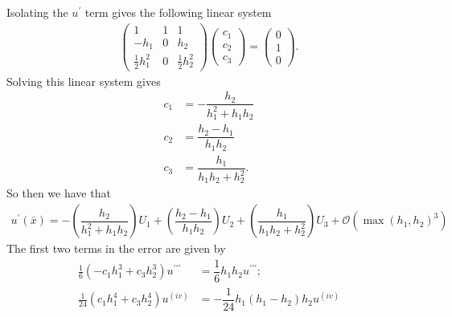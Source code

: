 \documentclass[12pt]{article}
\newcommand{\xbar}{\bar{x}}
\newcommand{\bO}{\mathcal{O}}
\begin{document}
Isolating the $u^{\prime}$ term gives the following linear system
\begin{align}
    \begin{pmatrix}
        1 & 1 & 1\\
        -h_{1} & 0 & h_{2}\\
        \frac{1}{2}h_{1}^{2} & 0 & \frac{1}{2}h_{2}^{2}
    \end{pmatrix}
    \begin{pmatrix}
        c_{1} \\ c_{2} \\ c_{3}
    \end{pmatrix}
    =
    \begin{pmatrix}
        0 \\ 1 \\ 0
    \end{pmatrix}.
\end{align}
Solving this linear system gives
\begin{align}
    c_{1} &= -\dfrac{h_{2}}{h_{1}^{2}+h_{1}h_{2}}\\
    c_{2} &= \dfrac{h_{2}-h_{1}}{h_{1}h_{2}}\\
    c_{3} &= \dfrac{h_{1}}{h_{1}h_{2}+h_{2}^{2}}.
\end{align}
So then we have that
\begin{align}
    u^{\prime}(\xbar) = -\left(\dfrac{h_{2}}{h_{1}^{2}+h_{1}h_{2}}\right)U_{1}
    + \left(\dfrac{h_{2}-h_{1}}{h_{1}h_{2}}\right)U_{2}
    + \left(\dfrac{h_{1}}{h_{1}h_{2}+h_{2}^{2}}\right)U_{3}
    + \bO(\max(h_{1},h_{2})^{3})
\end{align}
The first two terms in the error are given by
\begin{subequations}
    \begin{align}
         \frac{1}{6}(-c_{1}h_{1}^{3}+c_{3}h_{2}^{3})u^{\prime\prime\prime}
         &= \dfrac{1}{6}h_{1}h_{2}u^{\prime\prime\prime};\\
          \frac{1}{24}(c_{1}h_{1}^{4}+c_{3}h_{2}^{4})u^{(iv)} &= -\dfrac{1}{24}h_{1}(h_{1}-h_{2})h_{2}u^{(iv)}
    \end{align}
\end{subequations}
\end{document}
